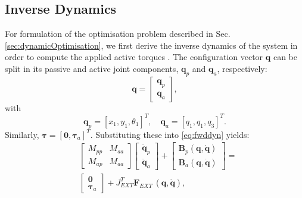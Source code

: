 \documentclass[letterpaper, 10 pt, conference]{ieeeconf}  %
\begin{document}


\subsection{Inverse Dynamics}
For formulation of the optimisation problem described in Sec. \ref{sec:dynamicOptimisation}, we first derive the inverse dynamics of the system in order to compute the applied active torques \cite{nakanishi2007inverse}. The configuration vector $\mathbf{q}$ can be split in its passive and active joint components, $\mathbf{q}_p$ and $\mathbf{q}_a$, respectively:
\begin{equation}
\mathbf{q} =
\begin{bmatrix}
	\mathbf{q}_p \\
	\mathbf{q}_a
\end{bmatrix},
\end{equation}
with
\begin{equation}
\mathbf{q}_p = [x_1,y_1,\theta_1]^T, \quad  
\mathbf{q}_a = [q_1,q_1,q_3]^T.
\end{equation}
\noindent
Similarly, $\boldsymbol{\tau} = \left[\mathbf{0},\boldsymbol{\tau}_a\right]^T$.
Substituting these into \eqref{eq:fwddyn} yields:
\begin{equation}
\begin{aligned}
&\left[\begin{array}{cc}  
M_{pp} & M_{aa}\\
M_{ap} & M_{aa}
\end{array} \right]
\left[\begin{array}{c}  
\mathbf{\ddot q}_p\\
\mathbf{\ddot q}_a
\end{array} \right] +
\left[\begin{array}{c}  
\mathbf{B}_p \mathbf{(q,\dot q)}\\
\mathbf{B}_a \mathbf{(q,\dot q)}
\end{array} \right] 
=\\
&\left[\begin{array}{c}  
\mathbf{0}\\
\boldsymbol{\tau}_a
\end{array} \right] 
+
J_{EXT}^T
\mathbf{F}_{EXT} \, \mathbf{(q, \dot q)},
\end{aligned} \label{eq:ik}
\end{equation}		
\end{document}
